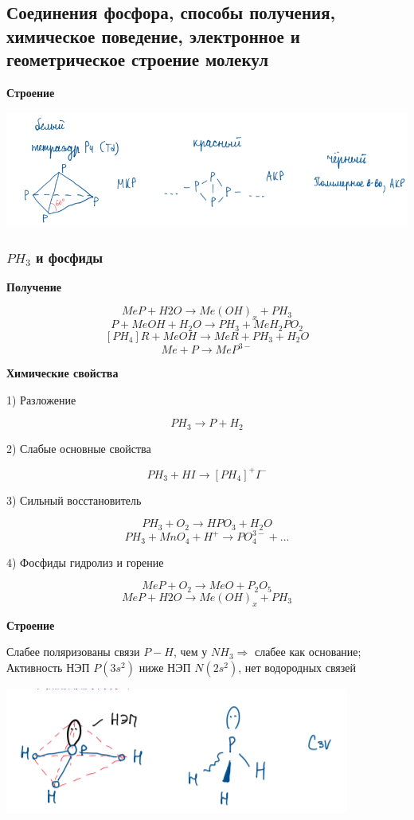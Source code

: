 \subsection{Соединения фосфора, способы получения, химическое поведение, электронное и геометрическое строение молекул}
\textbf{Строение}

\includegraphics{images/9v1.png}

\subsubsection*{$PH_3$ и фосфиды}

\textbf{Получение}

$$MeP + H2O \rightarrow Me(OH)_x + PH_3$$
$$P + MeOH + H_2O \rightarrow PH_3 + MeH_2PO_2$$
$$[PH_4]R + MeOH \rightarrow MeR + PH_3 + H_2O$$
$$Me + P \rightarrow MeP^{3-}$$

\textbf{Химические свойства}

1) Разложение

$$PH_3 \rightarrow P + H_2$$

2) Слабые основные свойства

$$PH_3 + HI \rightarrow [PH_4]^+I^-$$

3) Сильный восстановитель

$$PH_3 + O_2 \rightarrow HPO_3 + H_2O$$
$$PH_3 + MnO_4 + H^+ \rightarrow PO_4^{3-}+...$$

4) Фосфиды  гидролиз  и горение

$$MeP + O_2 \rightarrow MeO + P_2O_5$$
$$MeP + H2O \rightarrow Me(OH)_x + PH_3$$

\textbf{Строение}

Слабее поляризованы связи $P-H$, чем у $NH_3 \Rightarrow$ слабее как основание;\\
Активность НЭП $P (3s^2)$ ниже НЭП $N (2s^2)$, нет водородных связей

\includegraphics{images/9v2.png}

